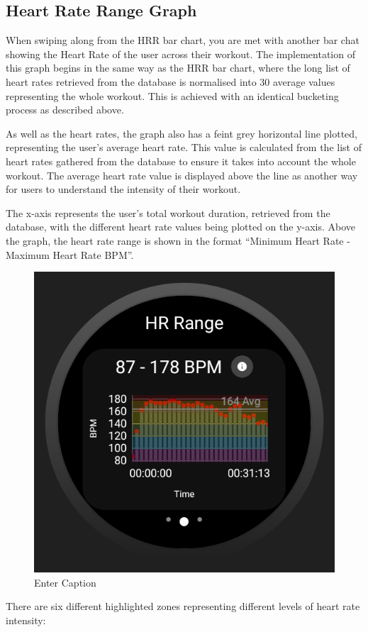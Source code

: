 \documentclass{l4proj}
\begin{document}
\subsection{Heart Rate Range Graph}
\label{sec:hrrangegraph}

When swiping along from the HRR bar chart, you are met with another bar chat showing the Heart Rate of the user across their workout. The implementation of this graph begins in the same way as the HRR bar chart, where the long list of heart rates retrieved from the database is normalised into 30 average values representing the whole workout. This is achieved with an identical bucketing process as described above.

As well as the heart rates, the graph also has a feint grey horizontal line plotted, representing the user’s average heart rate. This value is calculated from the list of heart rates gathered from the database to ensure it takes into account the whole workout. The average heart rate value is displayed above the line as another way for users to understand the intensity of their workout.

The x-axis represents the user’s total workout duration, retrieved from the database, with the different heart rate values being plotted on the y-axis. Above the graph, the heart rate range is shown in the format “{Minimum Heart Rate} - {Maximum Heart Rate} BPM”.

\begin{figure}[h!]
    \centering
    \includegraphics[width=0.5\linewidth]{dissertation//dissImages/HRRangeGraph.png}
    \caption{Enter Caption}
    \label{fig:enter-label}
\end{figure}

There are six different highlighted zones representing different levels of heart rate intensity:
\end{document}
